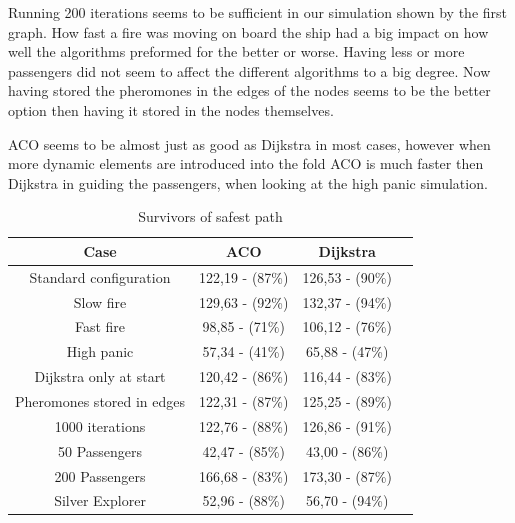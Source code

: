 Running 200 iterations seems to be sufficient in our simulation shown by the first graph. How fast a fire was moving on board the ship had a big impact on how well the algorithms preformed for the better or worse. Having less or more passengers did not seem to affect the different algorithms to a big degree. Now having stored the pheromones in the edges of the nodes seems to be the better option then having it stored in the nodes themselves.

ACO seems to be almost just as good as Dijkstra in most cases, however when more dynamic elements are introduced into the fold ACO is much faster then Dijkstra in guiding the passengers, when looking at the high panic simulation.


\begin{table}[ht]
\caption{Survivors of safest path} 				%
\centering										%
\begin{tabular}{c c c c}						%
\hline
\hline 											%
Case & ACO & Dijkstra \\[0.5ex]%
\hline											%
Standard configuration & 122,19 - (87\%) & 126,53 - (90\%) \\
Slow fire & 129,63 - (92\%) & 132,37 - (94\%) \\
Fast fire & 98,85 - (71\%) & 106,12 - (76\%) \\
High panic & 57,34 - (41\%) & 65,88 - (47\%) \\
Dijkstra only at start & 120,42 - (86\%) & 116,44 - (83\%) \\
Pheromones stored in edges & 122,31 - (87\%) & 125,25 - (89\%) \\
1000 iterations & 122,76 - (88\%) & 126,86 - (91\%) \\
50 Passengers & 42,47 - (85\%) & 43,00 - (86\%) \\
200 Passengers & 166,68 - (83\%) & 173,30 - (87\%) \\ 
Silver Explorer & 52,96 - (88\%) & 56,70 - (94\%) \\ [1ex]						%
\hline														%

\end{tabular}
\label{table:tableSafest}								
\end{table}


